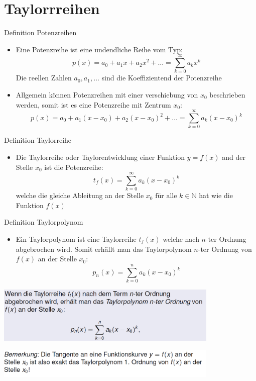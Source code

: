 \section{Taylorrreihen}
\begin{definition}{Definition Potenzreihen}\\
  \begin{itemize}
    \item Eine Potenzreihe ist eine undendliche Reihe vom Typ:
  \[p(x)=a_0+a_1x+a_2x^2+ \ldots = \sum_{k=0}^{\infty}{a_kx^k} \]
Die reellen Zahlen \(a_0,a_1, \ldots\) sind die Koeffizientend der Potenzreihe
  \item Allgemein können Potenzreihen mit einer verschiebung von \(x_0\) beschrieben werden, somit ist es eine
    Potenzreihe mit Zentrum \(x_0\):
    \[p(x)=a_0+a_1(x-x_0)+a_2(x-x_0)^2+\ldots = \sum_{k=0}^{\infty}{a_k(x-x_0)^k}\]
\end{itemize}
\end{definition}
\begin{definition}{Definition Taylorreihe}\\
  \begin{itemize}
    \item Die Taylorreihe oder Taylorentwicklung einer Funktion \(y=f(x)\) and der Stelle \(x_0\) ist die Potenzreihe:
      \[t_f(x)=\sum_{k=0}^{\infty}{a_k(x-x_0)^k}\]
      welche die gleiche Ableitung an der Stelle \(x_0 \text{ für alle }k\in \mathbb{N}\) hat wie die Funktion \(f(x)\)
  \end{itemize}
\end{definition}
\begin{definition}{Definition Taylorpolynom}\\
    \begin{itemize}
      \item Ein Taylorpolynom ist eine Taylorreihe \(t_f(x)\) welche nach \(n\text{-ter}\) Ordnung abgebrochen wird.
        Somit erhällt man das Taylorpolynom \(n\text{-ter}\) Ordnung von \(f(x)\) an der Stelle \(x_0\):
        \[p_n(x)=\sum_{k=0}^n{a_k(x-x_0)^k}\]
    \end{itemize}
  \begin{centering}
  \includegraphics[width=0.8\textwidth]{images/2024-06-02-19-16-13.png}\\
  \end{centering}
  \begin{centering}
  \includegraphics[width=0.8\textwidth]{images/2024-06-02-19-16-27.png}\\
  \end{centering}
\end{definition}
